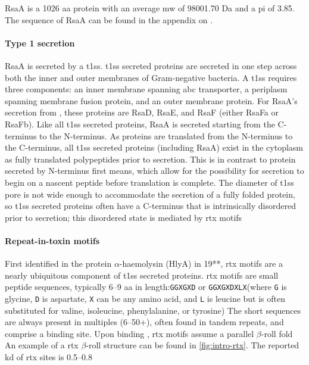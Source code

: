  RsaA is a 1026 \ac{aa} protein with an average \ac{mw} of 98001.70 Da and a \ac{pi} of 3.85. The sequence of RsaA can be found in the appendix on .

\paragraph{Type 1 secretion} RsaA is secreted by a \ac{t1ss}. \Ac{t1ss} secreted proteins are secreted in one step across both the inner and outer membranes of Gram-negative bacteria. A \ac{t1ss} requires three components: an inner membrane spanning \ac{abc} transporter, a periplasm spanning membrane fusion protein, and an outer membrane protein. For RsaA's secretion from \caulobacter, these proteins are RsaD, RsaE, and RsaF (either RsaFa or RsaFb). Like all \ac{t1ss} secreted proteins, RsaA is secreted starting from the C-terminus to the N-terminus. As proteins are translated from the N-terminus to the C-terminus, all \ac{t1ss} secreted proteins (including RsaA) exist in the cytoplasm as fully translated polypeptides prior to secretion. This is in contrast to protein secreted by N-terminus first means, which allow for the possibility for secretion to begin on a nascent peptide before translation is complete. The diameter of \ac{t1ss} pore is not wide enough to accommodate the secretion of a fully folded protein, so \ac{t1ss} secreted proteins often have a C-terminus that is intrinsically disordered prior to secretion; this disordered state is mediated by \ac{rtx} motifs   

    \paragraph{Repeat-in-toxin motifs} First identified in the \ecoli protein $\alpha$-haemolysin (HlyA) in 19**, \ac{rtx} motifs are a nearly ubiquitous component of \ac{t1ss} secreted proteins. \ac{rtx} motifs are small peptide sequences, typically 6--9 \ac{aa} in length:\texttt{GGXGXD} or \texttt{GGXGXDXLX}(where \texttt{G} is glycine, \texttt{D} is aspartate, \texttt{X} can be any amino acid, and \texttt{L} is leucine but is often substituted for valine, isoleucine, phenylalanine, or tyrosine) The short sequences are always present in multiples (6--50+), often found in tandem repeats, and comprise a  binding site. Upon binding , \ac{rtx} motifs assume a parallel $\beta$-roll fold An example of a \ac{rtx} $\beta$-roll structure can be found in \cref{fig:intro-rtx}. The reported \ac{kd} of \ac{rtx} sites is 0.5--0.8 \millimolar{}



